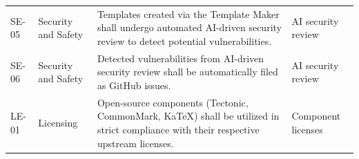 \begin{xltabular}{\textwidth}{@{}p{0.12\textwidth}p{0.18\textwidth}X X@{}}
SE-05 & Security and Safety & Templates created via the Template Maker shall undergo automated AI-driven security review to detect potential vulnerabilities. & AI security review \\
SE-06 & Security and Safety & Detected vulnerabilities from AI-driven security review shall be automatically filed as GitHub issues. & AI security review \\
LE-01 & Licensing & Open-source components (Tectonic, CommonMark, KaTeX) shall be utilized in strict compliance with their respective upstream licenses. & Component licenses \\
\end{xltabular}

